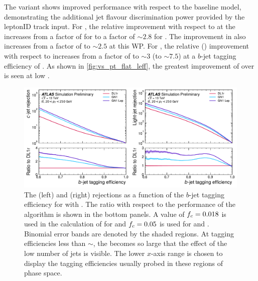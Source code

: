 The \GNNLep variant shows improved performance with respect to the baseline \GNN model, demonstrating the additional jet flavour discrimination power provided by the leptonID track input.
For \ttbarjets, the relative \crej improvement with respect to \DLr at the \bWP{\ttlo} increases from a factor of \ttbclo for \GNN to a factor of $\sim 2.8$ for \GNNLep.
The improvement in \lrej also increases from a factor of \ttbllo to $\sim 2.5$ at this WP.
For \Zprimejets, the relative \crej (\lrej) improvement with respect to \DLr increases from a factor of \zpbclo to $\sim 3$ (\zpbllo to $\sim 7.5$) at a $b$-jet tagging efficiency of \pct{\zplo}.
As shown in \cref{fig:vs_pt_flat_leff}, the greatest improvement of \GNNLep over \GNN is seen at low \pt.

\begin{figure}[!p]
    \centering
    \includegraphics[width=\textwidth]{chapters/gnn_tagger/figs/results/main/ttbar/ttbar_roc_btag.pdf}
    \caption{The \cjet (left) and \ljet (right) rejections as a function of the $b$-jet tagging efficiency for \ttbarjets with \ttbarpt.
             The ratio with respect to the performance of the \DLr algorithm is shown in the bottom panels.
             A value of $f_c = 0.018$ is used in the calculation of \Db for \DLr and $f_c = 0.05$ is used for \GNN and \GNNLep.
             Binomial error bands are denoted by the shaded regions.
             At \bjet tagging efficiencies less than $\sim$, the \lrej becomes so large that the effect of the low number of jets is visible.
             The lower $x$-axis range is chosen to display the \bjet tagging efficiencies usually probed in these regions of phase space.}
    \label{fig:ttbar_btag_roc}
\end{figure}

